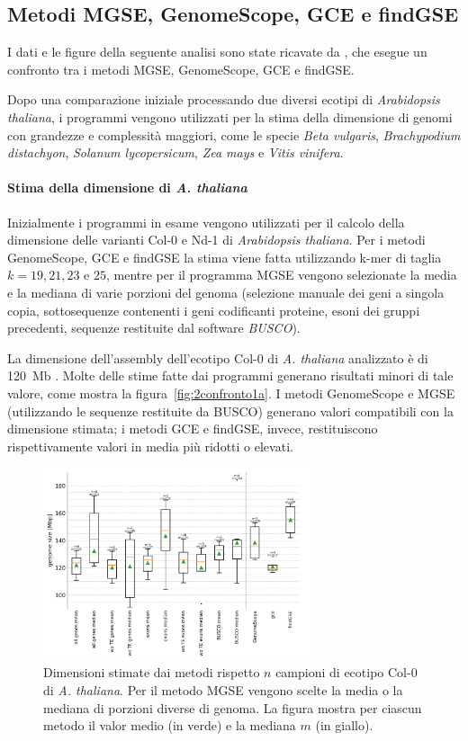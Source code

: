 \documentclass[crop=false, class=book]{standalone}
\begin{document}
		
	\subsection{Metodi MGSE, GenomeScope, GCE e findGSE}
	I dati e le figure della seguente analisi sono state ricavate da \cite{pucker2019MGSE}, che esegue un confronto tra i metodi MGSE, GenomeScope, GCE e findGSE. 
	
	Dopo una comparazione iniziale processando due diversi ecotipi di \textit{Arabidopsis thaliana}, i programmi vengono utilizzati per la stima della dimensione di genomi con grandezze e complessità maggiori, come le specie \textit{Beta vulgaris}, \textit{Brachypodium distachyon}, \textit{Solanum lycopersicum}, \textit{Zea mays} e \textit{Vitis vinifera}. 
		
	\paragraph{Stima della dimensione di \textit{A. thaliana}}
	Inizialmente i programmi in esame vengono utilizzati per il calcolo della dimensione delle varianti Col-0 e Nd-1 di \textit{Arabidopsis thaliana}. Per i metodi GenomeScope, GCE e findGSE la stima viene fatta utilizzando k-mer di taglia $k = 19, 21, 23 \text{ e } 25$, mentre per il programma MGSE vengono selezionate la media e la mediana di varie porzioni del genoma (selezione manuale dei geni a singola copia, sottosequenze contenenti i geni codificanti proteine, esoni dei gruppi precedenti, sequenze restituite dal software \textit{BUSCO}).
	
	La dimensione dell'assembly dell'ecotipo Col-0 di \textit{A. thaliana} analizzato è di 120~Mb \cite{initiative2000analysis}. Molte delle stime fatte dai programmi generano risultati minori di tale valore, come mostra la figura~\vref{fig:2confronto1a}. I metodi GenomeScope e MGSE (utilizzando le sequenze restituite da BUSCO) generano valori compatibili con la dimensione stimata; i metodi GCE e findGSE, invece, restituiscono rispettivamente valori in media più ridotti o elevati.
	
	\begin{figure}[htp]
		\centering
		\includegraphics[width=0.7\textwidth]{capitoli/analisi/confronto/confronto2/1a.png}
		\caption{Dimensioni stimate dai metodi rispetto $n$ campioni di ecotipo Col-0 di \textit{A. thaliana}. Per il metodo MGSE vengono scelte la media o la mediana di porzioni diverse di genoma. La figura mostra per ciascun metodo il valor medio (in verde) e la mediana $m$ (in giallo).}
		\label{fig:2confronto1a}
	\end{figure}
		
\end{document}
